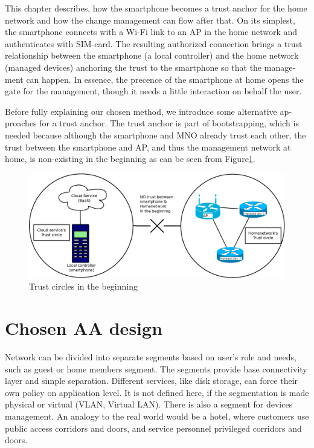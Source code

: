 \documentclass[12pt,a4paper,english]{tutthesis}
\begin{document}
\begin{otherlanguage}{english}
This chapter describes, how the smartphone becomes a trust anchor for
the home network and how the change management can flow after that.
On its simplest, the smartphone connects with a Wi-Fi link to an
AP in the home network and authenticates with SIM-card.
The resulting authorized connection brings a trust relationship
between the smartphone (a local controller)
and the home network (managed devices) anchoring the trust to the smartphone so that the 
management can happen. 
In essence, the precence of the smartphone at home
opens the gate for the management, though it needs a little
interaction on behalf the user.



Before fully explaining our chosen method, we introduce some 
alternative
approaches for a trust anchor. The trust anchor is part of bootstrapping,
which is needed because although the smartphone and MNO
already trust each other, the trust between the smartphone and AP, and
thus the management network at home, is non-existing in the
beginning as can be seen from Figure\ref{fig:trustbegin}.

\begin{figure}[htb]
\centering
\includegraphics[width=.9\linewidth]{trustcircles.png}
\caption{\label{fig:trustbegin}Trust circles in the beginning}
\end{figure}


\section{Chosen AA design}
\label{sec-4-1}
\label{sec:chosendesign}



Network can be divided into separate segments based on user's role and
needs, such as guest or home members segment. The segments provide
base connectivity layer and simple separation. Different services,
like disk storage, can force their own policy on application level.
It is not defined here, if the segmentation is made physical or
virtual (VLAN, Virtual LAN).  There is also a segment for devices
management.  An analogy to the real world would be a hotel, where
customers use public access corridors and doors, and service personnel
privileged corridors and doors.



\end{otherlanguage}
\end{document}
